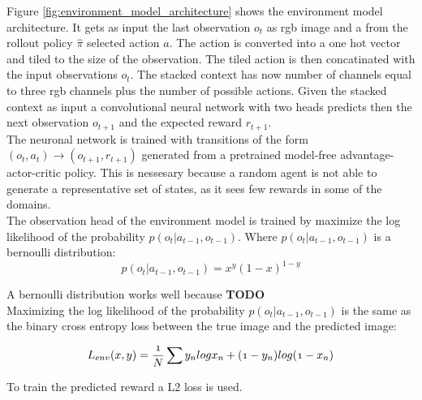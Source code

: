 Figure \ref{fig:environment_model_architecture} shows the environment model architecture.
It gets as input the last observation $o_t$ as rgb image and a from the rollout policy $\hat{\pi}$ selected action $a$. The action is converted into a one hot vector and tiled to the size of the observation.
The tiled action is then concatinated with the input observations $o_t$.
The stacked context has now number of channels equal to three rgb channels plus the number of possible actions.
Given the stacked context as input a convolutional neural network with two heads predicts then the next observation $o_{t+1}$ and the expected reward $r_{t+1}$.\\

The neuronal network is trained with transitions of the form $(o_t, a_t) \rightarrow (o_{t+1}, r_{t+1})$ generated from a pretrained model-free advantage-actor-critic policy. This is nessesary because a random agent is not able to generate a representative set of states, as it sees few rewards in some of the domains.\\

 
The observation head of the environment model is trained by maximize the log likelihood of the probability $p(o_t | a_{t-1}, o_{t-1})$.
Where $p(o_t | a_{t-1}, o_{t-1})$ is a bernoulli distribution: 
\begin{equation} 
   p(o_t | a_{t-1}, o_{t-1}) = x^y (1-x)^{1-y} 
\end{equation}

A bernoulli distribution works well because \textbf{TODO}\\
   
Maximizing the log likelihood of the probability $p(o_t | a_{t-1}, o_{t-1})$ is the same as the binary cross entropy loss between the true image and the predicted image:

   
\begin{equation} 
  \mathnormal{ 
  L_{env}(x, y) = \frac{1}{N} \sum y_n log x_n + (1-y_n) log(1- x_n) 
  } 
\end{equation}

To train the predicted reward a L2 loss is used.
 
 

